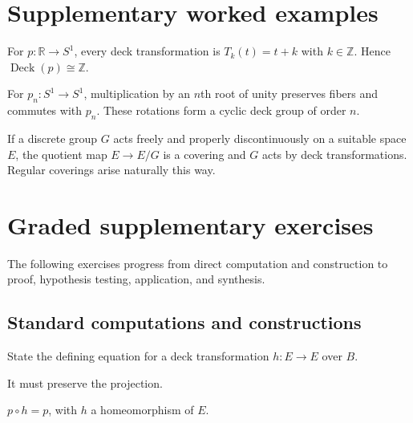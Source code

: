 \section{Supplementary worked examples}
\label{sec:viii12-pedagogy}

\begin{example}\label{ex:viii12-ped-01}
For $p:\mathbb R\to S^1$, every deck transformation is $T_k(t)=t+k$ with $k\in\mathbb Z$.  Hence $\operatorname{Deck}(p)\cong\mathbb Z$.
\end{example}

\begin{example}\label{ex:viii12-ped-02}
For $p_n:S^1\to S^1$, multiplication by an $n$th root of unity preserves fibers and commutes with $p_n$.  These rotations form a cyclic deck group of order $n$.
\end{example}

\begin{example}\label{ex:viii12-ped-03}
If a discrete group $G$ acts freely and properly discontinuously on a suitable space $E$, the quotient map $E\to E/G$ is a covering and $G$ acts by deck transformations.  Regular coverings arise naturally this way.
\end{example}

\section{Graded supplementary exercises}
The following exercises progress from direct computation and construction to proof, hypothesis testing, application, and synthesis.

\subsection*{Standard computations and constructions}

\begin{exercise}\label{exr:viii12-ped-01}
State the defining equation for a deck transformation $h:E\to E$ over $B$.
\end{exercise}
\begin{hint}
It must preserve the projection.
\end{hint}
\begin{solution}
$p\circ h=p$, with $h$ a homeomorphism of $E$.
\end{solution}

